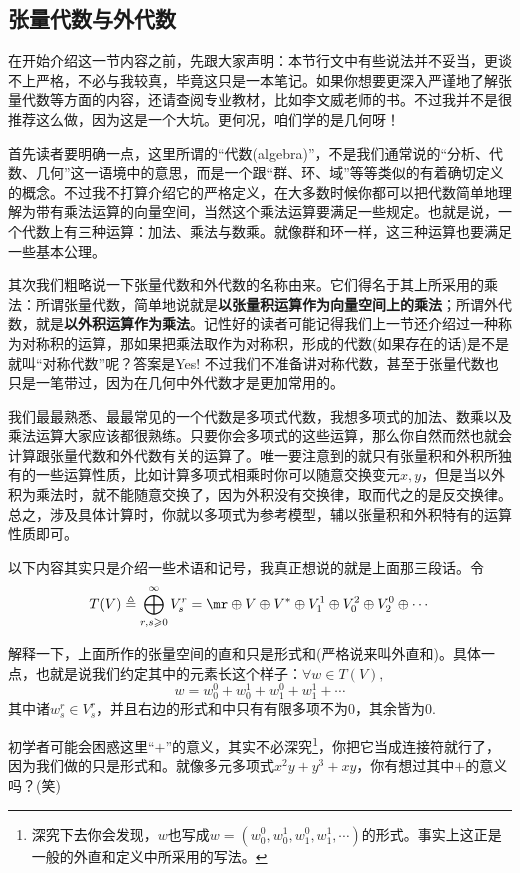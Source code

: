 \subsection{张量代数与外代数}

在开始介绍这一节内容之前，先跟大家声明：本节行文中有些说法并不妥当，更谈不上严格，不必与我较真，毕竟这只是一本笔记。如果你想要更深入严谨地了解张量代数等方面的内容，还请查阅专业教材，比如李文威老师的书。不过我并不是很推荐这么做，因为这是一个大坑。更何况，咱们学的是几何呀！

首先读者要明确一点，这里所谓的“代数(algebra)”，不是我们通常说的“分析、代数、几何”这一语境中的意思，而是一个跟“群、环、域”等等类似的有着确切定义的概念。不过我不打算介绍它的严格定义，在大多数时候你都可以把代数简单地理解为带有乘法运算的向量空间，当然这个乘法运算要满足一些规定。也就是说，一个代数上有三种运算：加法、乘法与数乘。就像群和环一样，这三种运算也要满足一些基本公理。

其次我们粗略说一下张量代数和外代数的名称由来。它们得名于其上所采用的乘法：所谓张量代数，简单地说就是\textbf{以张量积运算作为向量空间上的乘法}；所谓外代数，就是\textbf{以外积运算作为乘法}。记性好的读者可能记得我们上一节还介绍过一种称为对称积的运算，那如果把乘法取作为对称积，形成的代数(如果存在的话)是不是就叫“对称代数”呢？答案是Yes! 不过我们不准备讲对称代数，甚至于张量代数也只是一笔带过，因为在几何中外代数才是更加常用的。

我们最最熟悉、最最常见的一个代数是多项式代数，我想多项式的加法、数乘以及乘法运算大家应该都很熟练。只要你会多项式的这些运算，那么你自然而然也就会计算跟张量代数和外代数有关的运算了。唯一要注意到的就只有张量积和外积所独有的一些运算性质，比如计算多项式相乘时你可以随意交换变元$x,y$，但是当以外积为乘法时，就不能随意交换了，因为外积没有交换律，取而代之的是反交换律。总之，涉及具体计算时，你就以多项式为参考模型，辅以张量积和外积特有的运算性质即可。

以下内容其实只是介绍一些术语和记号，我真正想说的就是上面那三段话。令
\[
T(V)\triangleq \bigoplus_{r,s\geqslant 0}^{\infty} V^{r}_{s}=\mr\oplus V\oplus V^{\ast}\oplus V^{1}_{1}\oplus V^{2}_{0}\oplus V^{0}_{2}\oplus\cdots
\]

解释一下，上面所作的张量空间的直和只是形式和(严格说来叫外直和)。具体一点，也就是说我们约定其中的元素长这个样子：$\forall w\in T(V),$
\[
	w=w^{0}_{0}+w^{1}_{0}+w^{0}_{1}+w^{1}_{1}+\cdots
\]
其中诸$ w^{r}_{s}\in V^{r}_{s}$，并且右边的形式和中只有有限多项不为0，其余皆为0. 

初学者可能会困惑这里“$+$”的意义，其实不必深究\footnote{深究下去你会发现，$w$也写成$w=(w^{0}_{0},w^{1}_{0},w^{0}_{1},w^{1}_{1},\cdots)$的形式。事实上这正是一般的外直和定义中所采用的写法。}，你把它当成连接符就行了，因为我们做的只是形式和。就像多元多项式$x^{2}y+y^{3}+xy$，你有想过其中$+$的意义吗？(笑)

